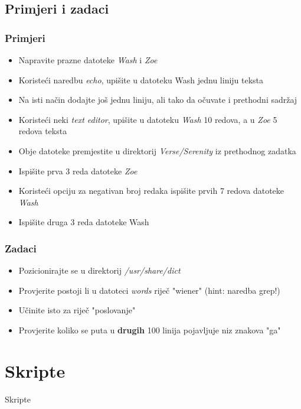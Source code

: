 \documentclass{beamer}
\begin{document}
\subsection{Primjeri i zadaci}
\begin{frame}[t]
\frametitle{Primjeri}
  \begin{itemize}
    \item Napravite prazne datoteke \textit{Wash} i \textit{Zoe}
    \item Koristeći naredbu \textit{echo}, upišite u datoteku Wash jednu liniju teksta
    \item Na isti način dodajte još jednu liniju, ali tako da očuvate i prethodni sadržaj
    \item Koristeći neki \textit{text editor}, upišite u datoteku \textit{Wash} 10 redova, a u \textit{Zoe} 5 redova teksta
    \item Obje datoteke premjestite u direktorij \textit{Verse/Serenity} iz prethodnog zadatka
    \item Ispišite prva 3 reda datoteke \textit{Zoe}
    \item Koristeći opciju za negativan broj redaka ispišite prvih 7 redova datoteke \textit{Wash}
    \item Ispišite druga 3 reda datoteke Wash
  \end{itemize}
\end{frame}




\begin{frame}[t]
\frametitle{Zadaci}
  \begin{itemize}
    \item Pozicionirajte se u direktorij \textit{/usr/share/dict}
    \item Provjerite postoji li u datoteci \textit{words} riječ "wiener" (hint: naredba grep!)
    \item Učinite isto za riječ "poslovanje"
    \item Provjerite koliko se puta u \textbf{drugih} 100 linija pojavljuje niz znakova "ga"
  \end{itemize}
\end{frame}


\section{Skripte}
\begin{frame}[c]
  \begin{center}
    \begin{Huge}
      Skripte
    \end{Huge}
  \end{center}
\end{frame}
\end{document}
